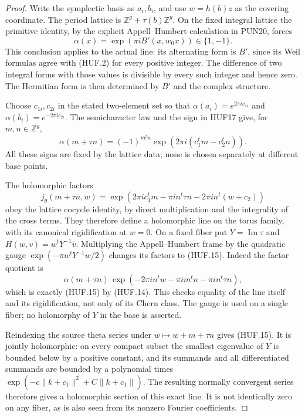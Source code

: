 \begin{proof}
Write the symplectic basis as \(a_i,b_i\), and
use \(w=h(b)z\) as the covering coordinate.
The period lattice is
\(\mathbb Z^g+\tau(b)\mathbb Z^g\).
On the fixed integral lattice the primitive
identity, by the explicit Appell--Humbert
calculation in PUN20, forces
\[
          \alpha(x)=\exp(\pi iB'(x,w_0x))\in\{1,-1\}.
 \tag{HUF.13}
\]
This conclusion applies to the actual line:
its alternating form is \(B'\), since its
Weil formulas agree with (HUF.2) for every
positive integer.  The difference of two
integral forms with those values is divisible
by every such integer and hence zero.
The Hermitian form is then determined by
\(B'\) and the complex structure.

Choose \(c_{1i},c_{2i}\) in the stated two-element
set so that
\(\alpha(a_i)=e^{2\pi i c_{1i}}\) and
\(\alpha(b_i)=e^{-2\pi i c_{2i}}\).
The semicharacter law and the sign in HUF17
give, for \(m,n\in\mathbb Z^g\),
\[
 \alpha(m+\tau n)=
       (-1)^{m^tn}\exp(2\pi i(c_1^tm-c_2^tn)).
 \tag{HUF.14}
\]
All these signs are fixed by the lattice data;
none is chosen separately at different base points.

The holomorphic factors
\[
 j_\theta(m+\tau n,w)=
 \exp\!\left(2\pi i c_1^tm-\pi i n^t\tau n
                  -2\pi i n^t(w+c_2)\right)
 \tag{HUF.15}
\]
obey the lattice cocycle identity, by direct
multiplication and the integrality of the
cross terms.  They therefore define a
holomorphic line on the torus family, with
its canonical rigidification at \(w=0\).
On a fixed fiber put \(Y=\operatorname{Im}\tau\)
and \(H(w,v)=w^tY^{-1}\bar v\).
Multiplying the Appell--Humbert frame by the
quadratic gauge
\(\exp(-\pi w^tY^{-1}w/2)\) changes its factors
to (HUF.15).  Indeed the factor quotient is
\[
 \alpha(m+\tau n)\,
 \exp(-2\pi i n^tw-\pi i m^tn-\pi i n^t\tau n),
 \]
which is exactly (HUF.15) by (HUF.14).
This checks equality of the line itself and
its rigidification, not only of its Chern
class.  The gauge is used on a single fiber;
no holomorphy of \(Y\) in the base is asserted.

Reindexing the source theta series under
\(w\mapsto w+m+\tau n\) gives (HUF.15).
It is jointly holomorphic: on every compact
subset the smallest eigenvalue of \(Y\) is
bounded below by a positive constant, and
its summands and all differentiated summands
are bounded by a polynomial times
\(\exp(-c\|k+c_1\|^2+C\|k+c_1\|)\).
The resulting normally convergent series
therefore gives a holomorphic section of
this exact line.  It is not identically
zero on any fiber, as is also seen from
its nonzero Fourier coefficients.
\end{proof}


